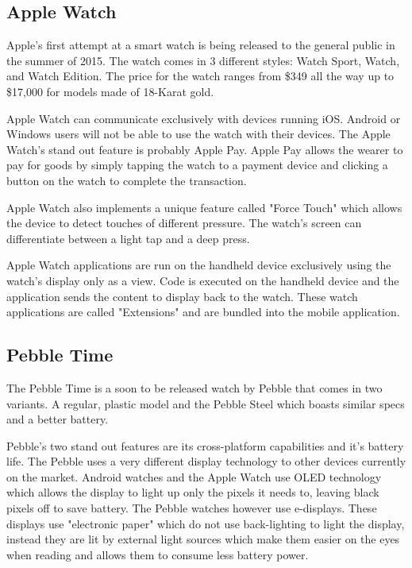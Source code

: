 \subsection{Apple Watch}
Apple's first attempt at a smart watch is being released to the general public
in the summer of 2015. The watch comes in 3 different styles: Watch Sport,
Watch, and Watch Edition. The price for the watch ranges from \$349 all the way
up to \$17,000 for models made of 18-Karat gold.

Apple Watch can communicate exclusively with devices running iOS. Android or
Windows users will not be able to use the watch with their devices. The Apple
Watch's stand out feature is probably Apple Pay. Apple Pay allows the wearer to
pay for goods by simply tapping the watch to a payment device and clicking a
button on the watch to complete the transaction.

Apple Watch also implements a unique feature called "Force Touch" which allows
the device to detect touches of different pressure. The watch's screen can
differentiate between a light tap and a deep press.

Apple Watch applications are run on the handheld device exclusively using the
watch's display only as a view. Code is executed on the handheld device and
the application sends the content to display back to the watch. These watch 
applications are called "Extensions" and are bundled into the mobile
application.

\subsection{Pebble Time}

The Pebble Time is a soon to be released watch by Pebble that comes in two
variants. A regular, plastic model and the Pebble Steel which boasts similar
specs and a better battery.

Pebble's two stand out features are its cross-platform capabilities and it's
battery life. The Pebble uses a very different display technology to other
devices currently on the market. Android watches and the Apple Watch use OLED
technology which allows the display to light up only the pixels it needs to,
leaving black pixels off to save battery. The Pebble watches however use
e-displays. These displays use "electronic paper" which do not use back-lighting
to light the display, instead they are lit by external light sources which
make them easier on the eyes when reading and allows them to consume less battery
power.

